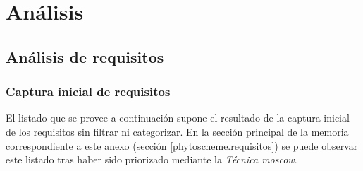 \chapter{Análisis} \label{c.analisis}



\section{Análisis de requisitos} 
\label{c.analisis.requisitos}

\subsection{Captura inicial de requisitos} 
\label{c.analisis.requisitos.iniciales}
\par El listado que se provee a continuación supone el resultado de la captura inicial de los requisitos sin filtrar ni categorizar. En la sección principal de la memoria correspondiente a este anexo (sección \ref{phytoscheme.requisitos}) se puede observar este listado tras haber sido priorizado mediante la \textit{Técnica \gls{moscow}}.

